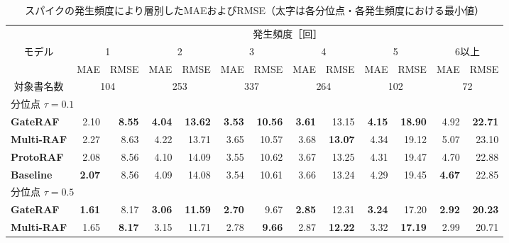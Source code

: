 \documentclass[twocolumn, lastpage]{jarticle}
\newif\ifrevmark
\newcommand{\revAcolor}{\ifrevmark\color{blue}\fi}
\begin{document}
\begin{table}[t]
    \revAcolor
    \caption{スパイクの発生頻度により層別したMAEおよびRMSE（太字は各分位点・各発生頻度における最小値）}
    \label{tab:spike_profile}
    \centering
    \setlength{\tabcolsep}{3pt}%
    \begin{tabular}{lrrrrrrrrrrrr}
        \hline
        & \multicolumn{12}{c}{発生頻度［回］} \\
        \cline{2-13}
        \multicolumn{1}{c}{モデル} & \multicolumn{2}{c}{1} & \multicolumn{2}{c}{2} & \multicolumn{2}{c}{3} & \multicolumn{2}{c}{4} & \multicolumn{2}{c}{5} & \multicolumn{2}{c}{6以上} \\
        \cline{2-3} \cline{4-5} \cline{6-7} \cline{8-9} \cline{10-11} \cline{12-13}
         & MAE & RMSE & MAE & RMSE & MAE & RMSE & MAE & RMSE & MAE & RMSE & MAE & RMSE \\
        \hline
        \multicolumn{1}{c}{対象書名数} & \multicolumn{2}{c}{104} & \multicolumn{2}{c}{253} & \multicolumn{2}{c}{337} & \multicolumn{2}{c}{264} & \multicolumn{2}{c}{102} & \multicolumn{2}{c}{72} \\
        \hline\hline
        \multicolumn{13}{l}{分位点 $\tau=0.1$} \\
        \quad \textbf{GateRAF} & 2.10 & \textbf{8.55} & \textbf{4.04} & \textbf{13.62} & \textbf{3.53} & \textbf{10.56} & \textbf{3.61} & 13.15 & \textbf{4.15} & \textbf{18.90} & 4.92 & \textbf{22.71} \\
        \quad \textbf{Multi-RAF} & 2.27 & 8.63 & 4.22 & 13.71 & 3.65 & 10.57 & 3.68 & \textbf{13.07} & 4.34 & 19.12 & 5.07 & 23.10 \\
        \quad \textbf{ProtoRAF} & 2.08 & 8.56 & 4.10 & 14.09 & 3.55 & 10.62 & 3.67 & 13.25 & 4.31 & 19.47 & 4.70 & 22.88 \\
        \quad \textbf{Baseline} & \textbf{2.07} & 8.56 & 4.09 & 14.08 & 3.54 & 10.61 & 3.66 & 13.24 & 4.29 & 19.45 & \textbf{4.67} & 22.85 \\
        \hline
        \multicolumn{13}{l}{分位点 $\tau=0.5$} \\
        \quad \textbf{GateRAF} & \textbf{1.61} & 8.17 & \textbf{3.06} & \textbf{11.59} & \textbf{2.70} & 9.67 & \textbf{2.85} & 12.31 & \textbf{3.24} & 17.20 & \textbf{2.92} & \textbf{20.23} \\
        \quad \textbf{Multi-RAF} & 1.65 & \textbf{8.17} & 3.15 & 11.71 & 2.78 & \textbf{9.66} & 2.87 & \textbf{12.22} & 3.32 & \textbf{17.19} & 2.99 & 20.71 \\

\end{tabular}
\end{table}
\end{document}

